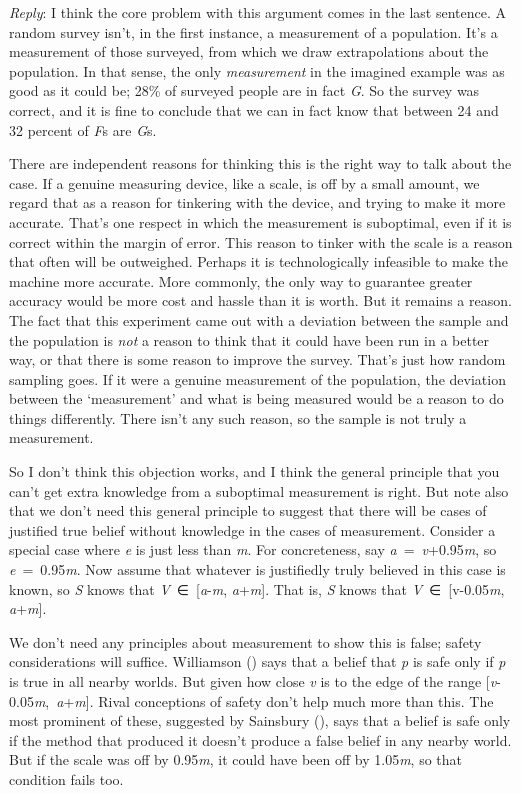 \documentclass[
  11pt,
  letterpaper,
  DIV=11,
  numbers=noendperiod,
  twoside]{scrartcl}
\begin{document}
\emph{Reply}: I think the core problem with this argument comes in the
last sentence. A random survey isn't, in the first instance, a
measurement of a population. It's a measurement of those surveyed, from
which we draw extrapolations about the population. In that sense, the
only \emph{measurement} in the imagined example was as good as it could
be; 28\% of surveyed people are in fact \emph{G}. So the survey was
correct, and it is fine to conclude that we can in fact know that
between 24 and 32 percent of \emph{F}s are \emph{G}s.

There are independent reasons for thinking this is the right way to talk
about the case. If a genuine measuring device, like a scale, is off by a
small amount, we regard that as a reason for tinkering with the device,
and trying to make it more accurate. That's one respect in which the
measurement is suboptimal, even if it is correct within the margin of
error. This reason to tinker with the scale is a reason that often will
be outweighed. Perhaps it is technologically infeasible to make the
machine more accurate. More commonly, the only way to guarantee greater
accuracy would be more cost and hassle than it is worth. But it remains
a reason. The fact that this experiment came out with a deviation
between the sample and the population is \emph{not} a reason to think
that it could have been run in a better way, or that there is some
reason to improve the survey. That's just how random sampling goes. If
it were a genuine measurement of the population, the deviation between
the `measurement' and what is being measured would be a reason to do
things differently. There isn't any such reason, so the sample is not
truly a measurement.

So I don't think this objection works, and I think the general principle
that you can't get extra knowledge from a suboptimal measurement is
right. But note also that we don't need this general principle to
suggest that there will be cases of justified true belief without
knowledge in the cases of measurement. Consider a special case where
\emph{e} is just less than \emph{m}. For concreteness, say
\emph{a}~=~\emph{v}+0.95\emph{m}, so \emph{e}~=~0.95\emph{m}. Now assume
that whatever is justifiedly truly believed in this case is known, so
\emph{S} knows that \emph{V}~∈~{[}\emph{a}-\emph{m},
\emph{a}+\emph{m}{]}. That is, \emph{S} knows that
\emph{V}~∈~{[}v-0.05\emph{m}, \emph{a}+\emph{m}{]}.

We don't need any principles about measurement to show this is false;
safety considerations will suffice. Williamson
() says that a belief that
\emph{p} is safe only if \emph{p} is true in all nearby worlds. But
given how close \emph{v} is to the edge of the range
{[}\emph{v}-0.05\emph{m},~\emph{a}+\emph{m}{]}. Rival conceptions of
safety don't help much more than this. The most prominent of these,
suggested by Sainsbury (), says that a
belief is safe only if the method that produced it doesn't produce a
false belief in any nearby world. But if the scale was off by
0.95\emph{m}, it could have been off by 1.05\emph{m}, so that condition
fails too.
\end{document}
